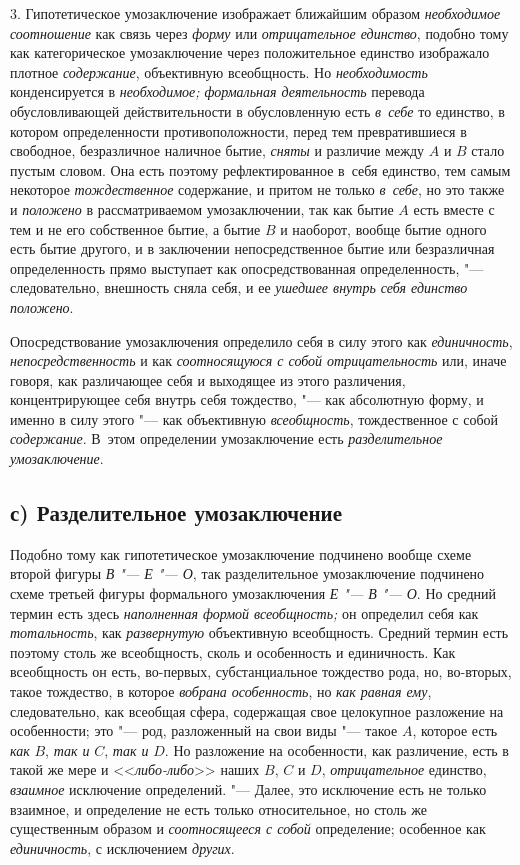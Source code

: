 3. Гипотетическое умозаключение изображает ближайшим образом
{\em необходимое соотношение}
как связь через {\em форму} или {\em отрицательное единство},
подобно тому как категорическое умозаключение через
положительное единство изображало плотное
{\em содержание}, объективную всеобщность. Но {\em необходимость}
конденсируется в {\em необходимое; формальная деятельность}
перевода обусловливающей действительности в обусловленную есть {\em в~себе} то
единство, в котором определенности противоположности, перед тем
превратившиеся в свободное, безразличное наличное бытие,
{\em сняты} и различие между $A$ и $B$ стало пустым
словом. Она есть поэтому рефлектированное в~себя единство,
тем самым некоторое {\em тождественное}
содержание, и притом не только {\em в~себе}, но это также и {\em положено} в
рассматриваемом умозаключении, так как бытие $A$ есть вместе с тем
и не его собственное бытие, а бытие $B$ и наоборот,
вообще бытие одного есть бытие другого, и в заключении непосредственное
бытие или безразличная определенность прямо выступает как опосредствованная
определенность, "--- следовательно, внешность сняла себя, и ее
{\em ушедшее внутрь себя единство положено}.

Опосредствование умозаключения определило себя в силу этого
как {\em единичность}, {\em непосредственность} и
как {\em соотносящуюся с собой
отрицательность} или, иначе говоря, как различающее себя и
выходящее из этого различения, концентрирующее себя внутрь себя тождество,
"--- как абсолютную форму, и именно в силу этого "--- как объективную
{\em всеобщность}, тождественное с собой {\em содержание}. В~этом
определении умозаключение есть {\em разделительное умозаключение}.

\subsection[с) Разделительное умозаключение]{с) Разделительное умозаключение}
Подобно тому как гипотетическое умозаключение подчинено вообще
схеме второй фигуры {\em В "--- Е "--- О}, так разделительное
умозаключение подчинено схеме третьей фигуры формального умозаключения
{\em Е "--- В "--- О}. Но средний термин есть здесь
{\em наполненная формой всеобщность;}
он определил себя как {\em тотальность}, как {\em развернутую}
объективную всеобщность. Средний термин есть поэтому столь же
всеобщность, сколь и особенность и единичность. Как всеобщность он есть,
во-первых, субстанциальное тождество рода, но, во-вторых, такое тождество,
в которое {\em вобрана особенность}, но {\em как равная ему},
следовательно, как всеобщая сфера, содержащая свое целокупное
разложение на особенности; это "--- род, разложенный на свои
виды "--- такое $A$,
которое есть {\em как} $B$, {\em так и} $C$, {\em так и} $D$. Но
разложение на особенности, как различение, есть в такой же мере и
<<{\em либо-либо}>> наших $B$, $C$ и $D$, {\em отрицательное}
единство, {\em взаимное} исключение определений. "--- Далее, это
исключение есть не только взаимное, и определение не есть только
относительное, но столь же существенным образом и {\em соотносящееся с собой}
определение; особенное как {\em единичность}, с исключением {\em других}.

